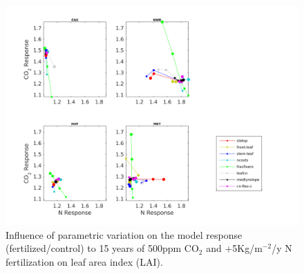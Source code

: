 \usepackage{}\documentclass[draft,linenumbers]{agujournal}
\begin{document}
  \begin{figure}[h]
     \includegraphics[width=1.35\textwidth]{matlab/figures/MAY19jp_relCNdep_defpft_TLAI_y2013.png}
     \caption{Influence of parametric variation on the model response (fertilized/control) to 15 years of 500ppm CO$_{2}$ and +5Kg/m$^{-2}$/y N fertilization on leaf area index (LAI).}
     \label{LAI_CN}
  \end{figure}
\end{document}
